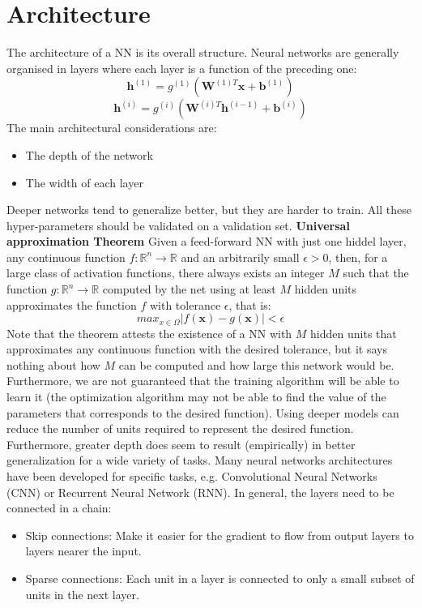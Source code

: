 \section{Architecture}
The architecture of a NN is its overall structure. Neural networks are generally organised in layers where each layer is a function of the preceding one:
\[\textbf{h}^{(1)} = g^{(1)}(\textbf{W}^{(1)T}\textbf{x} + \textbf{b}^{(1)})\]
\[\textbf{h}^{(i)} = g^{(i)}(\textbf{W}^{(i)T}\textbf{h}^{(i - 1)} + \textbf{b}^{(i)})\]
The main architectural considerations are:
\begin{itemize}
    \item The depth of the network
    \item The width of each layer
\end{itemize}
Deeper networks tend to generalize better, but they are harder to train.\newline\newline
All these hyper-parameters should be validated on a validation set.\newline\newline
\textbf{Universal approximation Theorem}\newline\newline
Given a feed-forward NN with just one hiddel layer, any continuous function $f:\mathbb{R}^{n} \rightarrow \mathbb{R}$ and an arbitrarily small $\epsilon > 0$, then, for a large class of activation functions, there always exists an integer $M$ such that the function $g: \mathbb{R}^{n} \rightarrow \mathbb{R}$ computed by the net using at least $M$ hidden units approximates the function $f$ with tolerance $\epsilon$, that is:
\[max_{x \in \Omega}|f(\textbf{x}) - g(\textbf{x})| < \epsilon\]
Note that the theorem attests the existence of a NN with $M$ hidden units that approximates any continuous function with the desired tolerance, but it says nothing about how $M$ can be computed and how large this network would be. Furthermore, we are not guaranteed that the training algorithm will be able to learn it (the optimization algorithm may not be able to find the value of the parameters that corresponds to the desired function).\newline\newline
Using deeper models can reduce the number of units required to represent the desired function. Furthermore, greater depth does seem to result (empirically) in better generalization for a wide variety of tasks.\newline\newline
Many neural networks architectures have been developed for specific tasks, e.g. Convolutional Neural Networks (CNN) or Recurrent Neural Network (RNN). In general, the layers need to be connected in a chain:
\begin{itemize}
    \item Skip connections: Make it easier for the gradient to flow from output layers to layers nearer the input.

    \item Sparse connections: Each unit in a layer is connected to only a small subset of units in the next layer.
\end{itemize}
